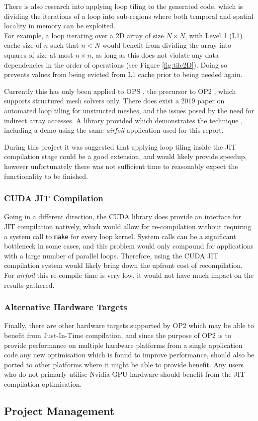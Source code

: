 \noindent There is also research into applying loop tiling to the generated code, which is dividing the iterations of a loop into sub-regions where both temporal and spatial locality in memory can be exploited.\\
For example, a loop iterating over a 2D array of size $N \times N$, with Level 1 (L1) cache size of $n$ such that $n < N$ would benefit from dividing the array into squares of size at most $n \times n$, as long as this does not violate any data dependencies in the order of operations (see Figure \ref{fig:tile2D}). Doing so prevents values from being evicted from L1 cache prior to being needed again.
\par
Currently this has only been applied to OPS \cite{opstiling}, the precursor to OP2 \cite{opsmain}, which supports structured mesh solvers only. There does exist a 2019 paper \cite{slope} on automated loop tiling for unstructed meshes, and the issues posed by the need for indirect array accesses. A library provided which demonstrates the technique \cite{SLOPErep}, including a demo using the same \textit{airfoil} application used for this report.
\par
During this project it was suggested that applying loop tiling inside the JIT compilation stage could be a good extension, and would likely provide speedup, however unfortunately there was not sufficient time to reasonably expect the functionality to be finished.

\subsubsection{CUDA JIT Compilation}
Going in a different direction, the CUDA library does provide an interface for JIT compilation natively, which would allow for re-compilation without requiring a system call to \verb|make| for every loop kernel. System calls can be a significant bottleneck in some cases, and this problem would only compound for applications with a large number of parallel loops. Therefore, using the CUDA JIT compilation system would likely bring down the upfront cost of recompilation. For \textit{airfoil} this re-compile time is very low, it would not have much impact on the results gathered.

\subsubsection{Alternative Hardware Targets}
Finally, there are other hardware targets supported by OP2 which may be able to benefit from Just-In-Time compilation, and since the purpose of OP2 is to provide performance on multiple hardware platforms from a single application code any new optimisation which is found to improve performance, should also be ported to other platforms where it might be able to provide benefit. Any users who do not  primarly utilise Nvidia GPU hardware should benefit from the JIT compilation optimisation.

\subsection{Project Management}
\label{ss:pm}
